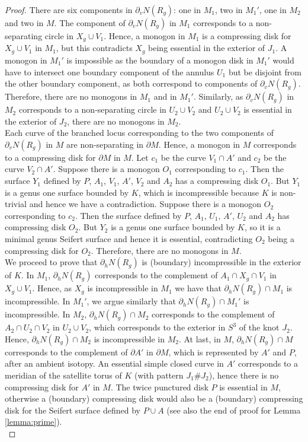\documentclass[reqno]{amsart}
\theoremstyle{definition}
\theoremstyle{remark}
\begin{document}
\begin{proof}
There are six components in $\partial_v N(R_g)$: one in $M_1$,  two in $M_1'$, one in $M_2$ and two in $M$.  The component of $\partial_v N(R_g)$ in $M_1$ corresponds to a non-separating circle in $X_g\cup V_1$.  Hence, a monogon in $M_1$  is a compressing disk for $X_g\cup V_1$ in $M_1$,  but this contradicts $X_g$ being essential in the exterior of $J_1$.  A monogon in $M_1'$ is impossible as the boundary of a monogon disk in $M_1'$ would have to intersect one boundary component of the annulus $U_1$ but be disjoint from the other boundary component,  as both correspond to components of $\partial_v N(R_g)$.  Therefore,  there are no monogons in $M_1$ and in $M_1'$.  Similarly, as $\partial_v N(R_g)$ in $M_2$ corresponds to a non-separating circle in $U_2\cup V_2$ and $U_2\cup V_2$ is essential in the exterior of $J_2$,   there are no monogons in $M_2$.\\
Each curve of the branched locus corresponding to the two components of $\partial_v N(R_g)$ in $M$ are non-separating in $\partial M$. Hence,  a monogon in $M$ corresponds to a compressing disk for $\partial M$ in $M$. Let $c_1$ be the curve $V_1\cap A'$ and $c_2$ be the curve $V_2\cap A'$. Suppose there is a monogon $O_1$ corresponding to $c_1$. Then the surface $Y_1$ defined by $P$, $A_1$, $V_1$, $A'$, $V_2$ and $A_2$ has a compressing disk $O_1$.  But $Y_1$ is a genus one surface bounded by $K$, which is incompressible because $K$ is non-trivial and hence we have a contradiction. Suppose there is a monogon $O_2$ corresponding to $c_2$.  Then the surface defined by $P, \, A_1, \, U_1, \, A', \,  U_2$ and $A_2$ has compressing disk $O_2$.  But $Y_2$ is a genus one surface bounded by $K$,  so it is a minimal genus Seifert surface and hence it is essential, contradicting $O_2$ being a compressing disk for $O_2$.  Therefore, there are no monogons in $M$.\\  


We proceed to prove that $\partial_h N(R_g)$ is (boundary) incompressible in the exterior of $K$. In $M_1$,  $\partial_h N(R_g)$ corresponds to the complement of $A_1 \cap X_g \cap V_1$ in $X_g\cup V_1$. Hence,  as $X_g$ is incompressible in $M_1$ we have that $\partial_h N(R_g)\cap M_1$ is incompressible.  In $M_1'$, we argue similarly that  $\partial_h N(R_g)\cap M_1'$ is incompressible.  In $M_2$, $\partial_h N(R_g)\cap M_2$ corresponds to the complement of $A_2 \cap U_2 \cap V_2$ in $U_2\cup V_2$, which corresponds to the exterior in $S^3$ of the knot $J_2$. Hence, $\partial_h N(R_g)\cap M_2$ is incompressible in $M_2$. At last, in $M$, $\partial_h N(R_g)\cap M$ corresponds to the complement of $\partial A'$ in $\partial M$, which is represented by $A'$ and $P$, after an ambient isotopy. An essential simple closed curve in $A'$ corresponds to a meridian of the satellite torus of $K$ (with pattern $J_1\#J_2$), hence there is no compressing disk for $A'$ in $M$. The twice punctured disk $P$ is essential in $M$, otherwise a (boundary) compressing disk would also be a (boundary) compressing disk for the Seifert surface defined by $P\cup A$  (see also the end of proof for Lemma \ref{lemma:prime}).\\



\end{proof}
\end{document}
